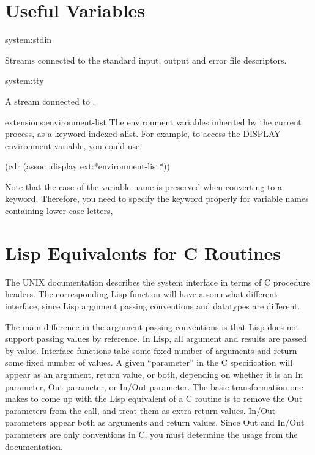 \section{Useful Variables}

\begin{defvar}{system:}{stdin}
   
  
  Streams connected to the standard input, output and error file
  descriptors.
\end{defvar}

\begin{defvar}{system:}{tty}
  
  A stream connected to .
\end{defvar}

\begin{defvar}{extensions:}{environment-list}
  The environment variables inherited by the current process, as a
  keyword-indexed alist. For example, to access the DISPLAY
  environment variable, you could use

\begin{lisp}
   (cdr (assoc :display ext:*environment-list*))
\end{lisp}

  Note that the case of the variable name is preserved when converting
  to a keyword.  Therefore, you need to specify the keyword properly for
  variable names containing lower-case letters,
\end{defvar}


\section{Lisp Equivalents for C Routines}

The UNIX documentation describes the system interface in terms of C
procedure headers.  The corresponding Lisp function will have a somewhat
different interface, since Lisp argument passing conventions and
datatypes are different.

The main difference in the argument passing conventions is that Lisp does not
support passing values by reference.  In Lisp, all argument and results are
passed by value.  Interface functions take some fixed number of arguments and
return some fixed number of values.  A given ``parameter'' in the C
specification will appear as an argument, return value, or both, depending on
whether it is an In parameter, Out parameter, or In/Out parameter.  The basic
transformation one makes to come up with the Lisp equivalent of a C routine is
to remove the Out parameters from the call, and treat them as extra return
values.  In/Out parameters appear both as arguments and return values.  Since
Out and In/Out parameters are only conventions in C, you must determine the
usage from the documentation.

